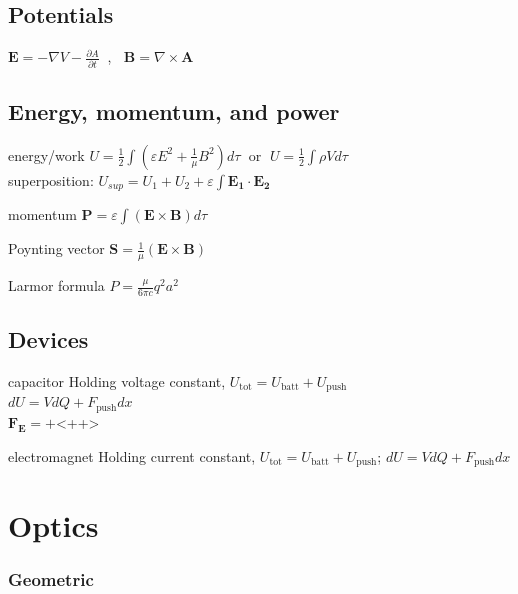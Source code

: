 \documentclass[letterpaper,landscape,10pt]{article}
\newenvironment{mydescription}
{\begin{description}
	\setlength{\itemsep}{0pt}
	\setlength{\parskip}{0pt}
	\setlength{\parsep}{-1pt}}
{\end{description}}
\begin{document}
{\begin{multicols}{4}
	\subsection*{Potentials}
		$\bm{E}=-\nabla V - \frac{\partial A}{\partial t}\;\;$, $\;\;\bm{B}=\nabla\times\bm{A}$

	\subsection*{Energy, momentum, and power}
		\begin{mydescription}
			\item[energy/work] $U = \frac{1}{2}\int\left( \varepsilon E^2+\frac{1}{\mu}B^2 \right) d\tau\;$ or $\;U = \frac{1}{2}\int\rho V d\tau$ \\
				superposition: $U_{sup} = U_1 + U_2 + \varepsilon\int\bm{E_1}\cdot\bm{E_2}$
			\item[momentum] $\bm{P} = \varepsilon\int\left( \bm{E}\times\bm{B} \right)d\tau$
			\item[Poynting vector] $\bm{S} = \frac{1}{\mu}\left( \bm{E}\times\bm{B} \right)$
			\item[Larmor formula] $P = \frac{\mu}{6\pi c}q^2a^2$
		\end{mydescription}

	\subsection*{Devices}
		\begin{mydescription}
			\item[capacitor] Holding voltage constant, $U_{\textrm{tot}} = U_{\textrm{batt}} + U_{\textrm{push}}$ \\
				$dU = VdQ + F_{\textrm{push}}dx$ \\
				$\bm{F_E} = +$<++>
			\item[electromagnet] Holding current constant, $U_{\textrm{tot}} = U_{\textrm{batt}} + U_{\textrm{push}}$; $dU = VdQ + F_{\textrm{push}}dx$ \\
		\end{mydescription}




\section*{Optics}
  \subsubsection*{Geometric}


\end{multicols}}
\end{document}
